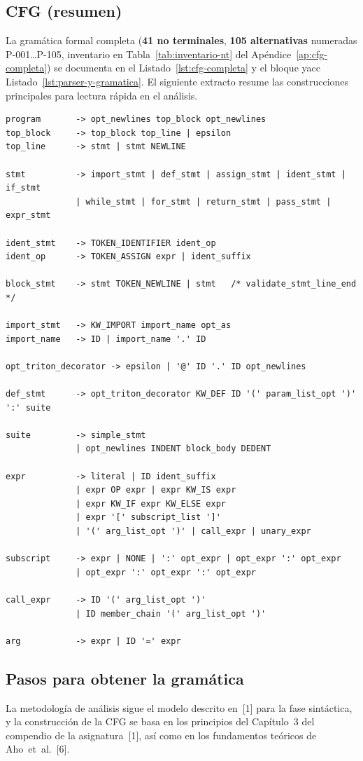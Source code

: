 \subsection{CFG (resumen)}
\label{sec:cfg_resumen}
La gramática formal completa (\textbf{41 no terminales}, \textbf{105 alternativas} numeradas P-001\ldots P-105, inventario en Tabla~\ref{tab:inventario-nt} del Apéndice~\ref{ap:cfg-completa}) se documenta en el Listado~\ref{lst:cfg-completa} y el bloque yacc Listado~\ref{lst:parser-y-gramatica}. El siguiente extracto resume las construcciones principales para lectura rápida en el análisis.

\begin{lstlisting}[caption={CFG resumida del lenguaje .tri (Triton kernel subset)}]
program       -> opt_newlines top_block opt_newlines
top_block     -> top_block top_line | epsilon
top_line      -> stmt | stmt NEWLINE

stmt          -> import_stmt | def_stmt | assign_stmt | ident_stmt | if_stmt
              | while_stmt | for_stmt | return_stmt | pass_stmt | expr_stmt

ident_stmt    -> TOKEN_IDENTIFIER ident_op
ident_op      -> TOKEN_ASSIGN expr | ident_suffix

block_stmt    -> stmt TOKEN_NEWLINE | stmt   /* validate_stmt_line_end */

import_stmt   -> KW_IMPORT import_name opt_as
import_name   -> ID | import_name '.' ID

opt_triton_decorator -> epsilon | '@' ID '.' ID opt_newlines

def_stmt      -> opt_triton_decorator KW_DEF ID '(' param_list_opt ')' ':' suite

suite         -> simple_stmt
              | opt_newlines INDENT block_body DEDENT

expr          -> literal | ID ident_suffix
              | expr OP expr | expr KW_IS expr
              | expr KW_IF expr KW_ELSE expr
              | expr '[' subscript_list ']'
              | '(' arg_list_opt ')' | call_expr | unary_expr

subscript     -> expr | NONE | ':' opt_expr | opt_expr ':' opt_expr
              | opt_expr ':' opt_expr ':' opt_expr

call_expr     -> ID '(' arg_list_opt ')'
              | ID member_chain '(' arg_list_opt ')'

arg           -> expr | ID '=' expr
\end{lstlisting}

\subsection{Pasos para obtener la gramática}
La metodología de análisis sigue el modelo descrito en~[1] para la fase sintáctica, y la construcción de la CFG se basa en los principios del Capítulo~3 del compendio de la asignatura~[1], así como en los fundamentos teóricos de Aho~et~al.~[6].

